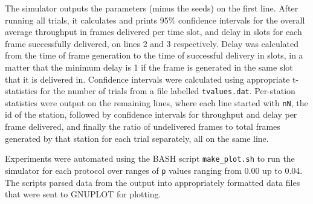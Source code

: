 \documentclass[twocolumn]{article}
\begin{document}
The simulator outputs the parameters (minus the seeds) on the first line. After
running all trials, it calculates and prints 95\% confidence intervals for the
overall average throughput in frames delivered per time slot, and delay in slots
for each frame successfully delivered, on lines 2 and 3 respectively. Delay was 
calculated from the time of frame generation to the time of successful delivery in slots,
in a matter that the minimum delay is 1 if the frame is generated in the same slot that it is
delivered in. Confidence
intervals were calculated using appropriate t-statistics for the number of
trials from a file labelled \verb|tvalues.dat|. Per-station statistics were output
on the remaining lines, where each line started with \verb|nN|, the id of the station,
followed by confidence intervals for throughput and delay per frame delivered, and finally
the ratio of undelivered frames to total frames generated by that station for each trial 
separately, all on the same line.

Experiments were automated using the BASH script \verb|make_plot.sh| 
to run the simulator for each protocol over ranges of \verb|p| values ranging
from 0.00 up to 0.04. The scripts parsed data from the output into appropriately
formatted data files that were sent to GNUPLOT for plotting.

    

\end{document}
